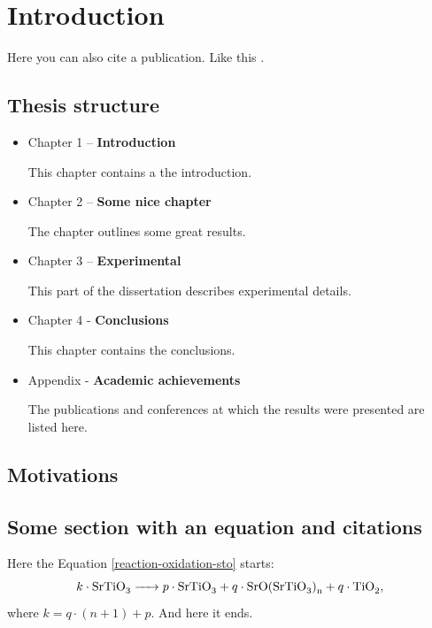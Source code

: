 \chapter{Introduction}


\lipsum[12]


Here you can also cite a publication. Like this \cite{Cie2022}.


\section{Thesis structure}

\lipsum[4]


\begin{itemize}
	\item Chapter 1 – \textbf{Introduction}
	
	This chapter contains a the introduction. 
	
	\item Chapter 2 – \textbf{Some nice chapter}
	
	The chapter outlines some great results.
	
	\item Chapter 3 – \textbf{Experimental}
	
	This part of the dissertation describes experimental details.

	\item Chapter 4 - \textbf{Conclusions}
	
	This chapter contains the conclusions.

	\item Appendix - \textbf{Academic achievements}
	
	The publications and conferences at which  the results were presented are listed here. 
\end{itemize}

\section{Motivations}

\lipsum[5-7]


\section{Some section with an equation and citations}


Here the Equation \ref{reaction-oxidation-sto} starts:
\begin{equation}
	k \cdot \ce{ SrTiO3} \ce{->} p \cdot \ce{ SrTiO3}  +   q \cdot \ce{SrO (SrTiO3)_n} +  q \cdot \ce{TiO2},
	\label{reaction-oxidation-sto}
\end{equation}
where $k = q\cdot (n+1) + p$. And here it ends.


